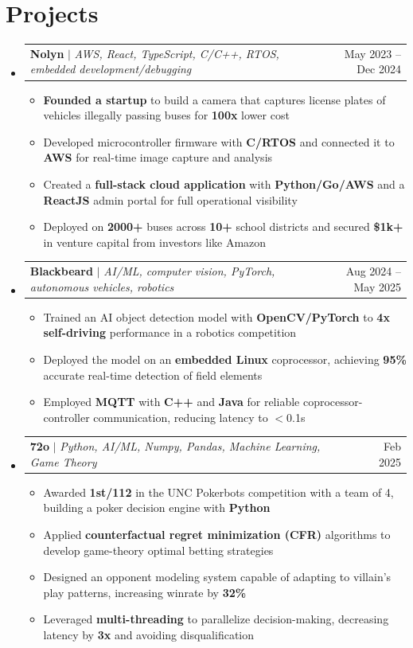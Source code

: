 \documentclass[letterpaper,11pt]{article}
\makeatletter
\newcommand{\resumeItem}[1]{
  \item\small{
    {#1 \vspace{-2pt}}}
}
\newcommand{\resumeProjectHeading}[2]{
    \item
    \begin{tabular*}{0.97\textwidth}{l@{\extracolsep{\fill}}r}
      #1 & #2 \\
    \end{tabular*}
    \vspace{-7pt}
}
\newcommand{\resumeSubHeadingListStart}{\begin{itemize}[leftmargin=0.15in, label={}]}
\newcommand{\resumeSubHeadingListEnd}{\end{itemize}}
\newcommand{\resumeItemListStart}{\begin{itemize}[leftmargin=0.15in]}
\newcommand{\resumeItemListEnd}{\end{itemize}\vspace{-5pt}}
\makeatother
\begin{document}
\section{Projects}
    \resumeSubHeadingListStart
      \resumeProjectHeading
          {\textbf{Nolyn} $|$ \emph{AWS, React, TypeScript, C/C++, RTOS, embedded development/debugging}}{ May 2023 -- Dec 2024}
          \resumeItemListStart
            \resumeItem{\textbf{Founded a startup} to build a camera that captures license plates of vehicles illegally passing buses for \textbf{100x} lower cost}
            \resumeItem{Developed microcontroller firmware with \textbf{C/RTOS} and connected it to \textbf{AWS} for real-time image capture and analysis}
            \resumeItem{Created a \textbf{full-stack cloud application} with \textbf{Python/Go/AWS} and a \textbf{ReactJS} admin portal for full operational visibility}
            \resumeItem{Deployed on \textbf{2000+} buses across \textbf{10+} school districts and secured \textbf{\$1k+} in venture capital from investors like Amazon}
          \resumeItemListEnd
      \resumeProjectHeading
        {\textbf{Blackbeard} $|$ \emph{AI/ML, computer vision, PyTorch, autonomous vehicles, robotics}}{Aug 2024 -- May 2025}
        \resumeItemListStart
          \resumeItem{Trained an AI object detection model with \textbf{OpenCV/PyTorch} to \textbf{4x} \textbf{self-driving} performance in a robotics competition}
          \resumeItem{Deployed the model on an \textbf{embedded Linux} coprocessor, achieving \textbf{95\%} accurate real-time detection of field elements}
          \resumeItem{Employed \textbf{MQTT} with \textbf{C++} and \textbf{Java} for reliable coprocessor-controller communication, reducing latency to $<$0.1s}
        \resumeItemListEnd
        \resumeProjectHeading
          {\textbf{72o} $|$ \emph{Python, AI/ML, Numpy, Pandas, Machine Learning, Game Theory}}{Feb 2025}
          \resumeItemListStart
            \resumeItem{Awarded \textbf{1st/112} in the UNC Pokerbots competition with a team of 4, building a poker decision engine with \textbf{Python}}
            \resumeItem{Applied \textbf{counterfactual regret minimization (CFR)} algorithms to develop game-theory optimal betting strategies}
            \resumeItem{Designed an opponent modeling system capable of adapting to villain's play patterns, increasing winrate by \textbf{32\%}}
            \resumeItem{Leveraged \textbf{multi-threading} to parallelize decision-making, decreasing latency by \textbf{3x} and avoiding disqualification}
          \resumeItemListEnd
    \resumeSubHeadingListEnd
\end{document}
